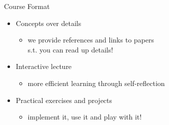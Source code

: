 \documentclass[aspectratio=169]{../latex_main/tntbeamer}  %
\begin{document}
\begin{frame}[c]{Course Format}

\begin{itemize}
	\item Concepts over details
	\begin{itemize}
	  \item we provide references and links to papers\\ s.t. you can read up details!
	\end{itemize}
	\smallskip
	\item Interactive lecture
	\begin{itemize}
	  \item more efficient learning through self-reflection
	\end{itemize}
	\smallskip
	\item Practical exercises and projects
	\begin{itemize}
	  \item implement it, use it and play with it!
	\end{itemize}
\end{itemize}

\end{frame}
\end{document}
